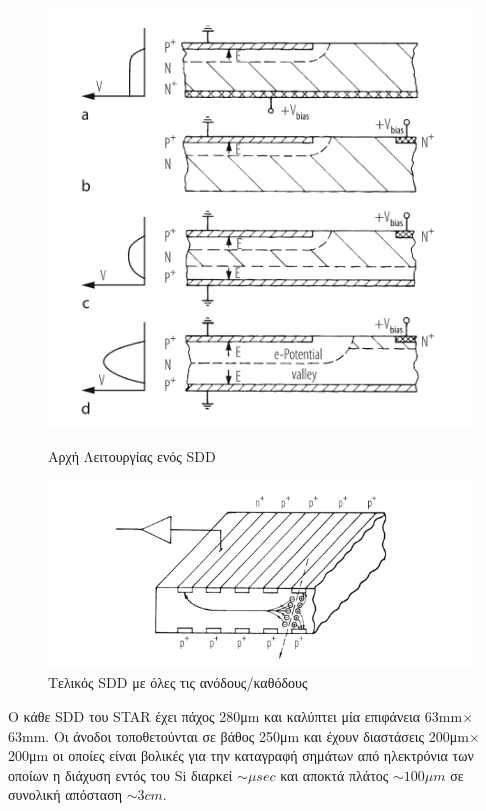 	\begin{figure}[h!]
    \centering
    \begin{minipage}{.5\textwidth}
        \centering
        \includegraphics[scale=0.6]{STAR_Detectors/SDD_v}
        \caption{Αρχή Λειτουργίας ενός SDD}
        \label{fig3.14}
    \end{minipage}%
    \begin{minipage}{0.5\textwidth}
        \centering
        \includegraphics[scale=0.7]{STAR_Detectors/SDD_2}
        \caption{Τελικός SDD με όλες τις ανόδους/καθόδους}
        \label{fig3.15}
    \end{minipage}
\end{figure}
	
	Ο κάθε SDD του STAR έχει πάχος 280μm και καλύπτει μία επιφάνεια 63mm$\times$63mm. Οι άνοδοι τοποθετούνται σε βάθος 250μm και έχουν διαστάσεις 200μm$\times$200μm οι οποίες είναι βολικές για την καταγραφή σημάτων από ηλεκτρόνια των οποίων η διάχυση εντός του Si διαρκεί $\sim \mu sec$ και αποκτά πλάτος $\sim 100\mu m$ σε συνολική απόσταση $\sim 3cm$. 

